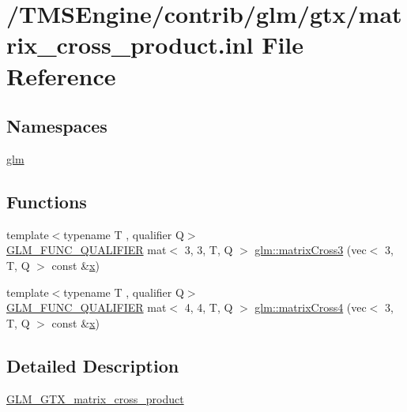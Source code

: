 \hypertarget{matrix__cross__product_8inl}{}\section{/\+T\+M\+S\+Engine/contrib/glm/gtx/matrix\+\_\+cross\+\_\+product.inl File Reference}
\label{matrix__cross__product_8inl}
\subsection*{Namespaces}
\begin{DoxyCompactItemize}
\item 
 \hyperlink{namespaceglm}{glm}
\end{DoxyCompactItemize}
\subsection*{Functions}
\begin{DoxyCompactItemize}
\item 
{\footnotesize template$<$typename T , qualifier Q$>$ }\\\hyperlink{setup_8hpp_a33fdea6f91c5f834105f7415e2a64407}{G\+L\+M\+\_\+\+F\+U\+N\+C\+\_\+\+Q\+U\+A\+L\+I\+F\+I\+ER} mat$<$ 3, 3, T, Q $>$ \hyperlink{group__gtx__matrix__cross__product_ga5802386bb4c37b3332a3b6fd8b6960ff}{glm\+::matrix\+Cross3} (vec$<$ 3, T, Q $>$ const \&\hyperlink{_s_d_l__opengl_8h_ad0e63d0edcdbd3d79554076bf309fd47}{x})
\item 
{\footnotesize template$<$typename T , qualifier Q$>$ }\\\hyperlink{setup_8hpp_a33fdea6f91c5f834105f7415e2a64407}{G\+L\+M\+\_\+\+F\+U\+N\+C\+\_\+\+Q\+U\+A\+L\+I\+F\+I\+ER} mat$<$ 4, 4, T, Q $>$ \hyperlink{group__gtx__matrix__cross__product_ga20057fff91ddafa102934adb25458cde}{glm\+::matrix\+Cross4} (vec$<$ 3, T, Q $>$ const \&\hyperlink{_s_d_l__opengl_8h_ad0e63d0edcdbd3d79554076bf309fd47}{x})
\end{DoxyCompactItemize}


\subsection{Detailed Description}
\hyperlink{group__gtx__matrix__cross__product}{G\+L\+M\+\_\+\+G\+T\+X\+\_\+matrix\+\_\+cross\+\_\+product} 